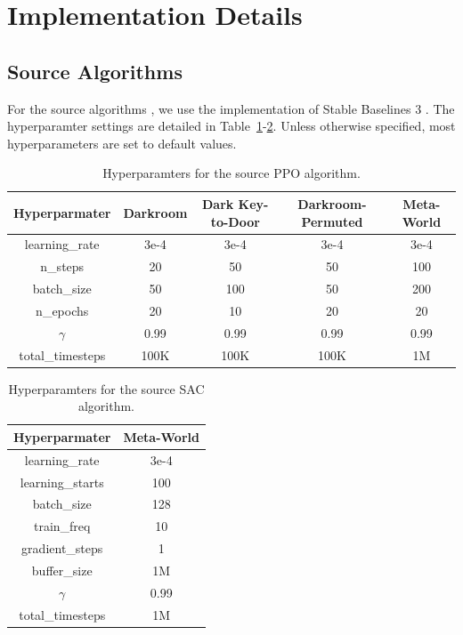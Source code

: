 \documentclass{article}
\begin{document}



\newpage
\appendix

\section{Implementation Details}
\label{sec:details}

\subsection{Source Algorithms}

For the source algorithms \citep{PPO, SAC}, we use the implementation of Stable Baselines 3 \citep{SB3}.
The hyperparamter settings are detailed in Table~\ref{tab:hyp-ppo}-\ref{tab:hyp-sac}.
Unless otherwise specified, most hyperparameters are set to default values.

\begin{table}[h]
    \caption{Hyperparamters for the source PPO algorithm.
    }
    \label{tab:hyp-ppo}
    \small \centering
    \begin{tabular}{ccccc}
    \toprule
    Hyperparmater & Darkroom & Dark Key-to-Door & Darkroom-Permuted & Meta-World\\
    \midrule
    learning\_rate & 3e-4 & 3e-4 & 3e-4 & 3e-4\\
    n\_steps & 20 & 50 & 50 & 100\\
    batch\_size & 50 & 100 & 50 & 200\\
    n\_epochs & 20 & 10 & 20 & 20\\
    $\gamma$ & 0.99 & 0.99 & 0.99 & 0.99\\
    \midrule
    total\_timesteps & 100K & 100K & 100K & 1M\\
    \bottomrule
    \end{tabular}
\end{table}

\begin{table}[h]
    \caption{Hyperparamters for the source SAC algorithm.
    }
    \label{tab:hyp-sac}
    \small \centering
    \begin{tabular}{cc}
    \toprule
    Hyperparmater & Meta-World\\
    \midrule
    learning\_rate & 3e-4\\
    learning\_starts & 100\\
    batch\_size & 128\\
    train\_freq & 10\\
    gradient\_steps & 1\\
    buffer\_size & 1M\\
    $\gamma$ & 0.99\\
    \midrule
    total\_timesteps & 1M\\
    \bottomrule
    \end{tabular}
\end{table}
\end{document}
